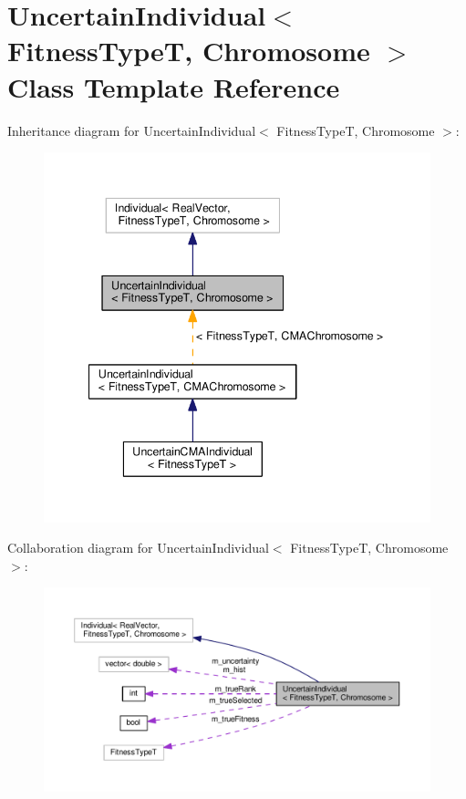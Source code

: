\hypertarget{classUncertainIndividual}{}\section{Uncertain\+Individual$<$ Fitness\+TypeT, Chromosome $>$ Class Template Reference}
\label{classUncertainIndividual}


Inheritance diagram for Uncertain\+Individual$<$ Fitness\+TypeT, Chromosome $>$\+:\nopagebreak
\begin{figure}[H]
\begin{center}
\leavevmode
\includegraphics[width=340pt]{classUncertainIndividual__inherit__graph}
\end{center}
\end{figure}


Collaboration diagram for Uncertain\+Individual$<$ Fitness\+TypeT, Chromosome $>$\+:\nopagebreak
\begin{figure}[H]
\begin{center}
\leavevmode
\includegraphics[width=350pt]{classUncertainIndividual__coll__graph}
\end{center}
\end{figure}
